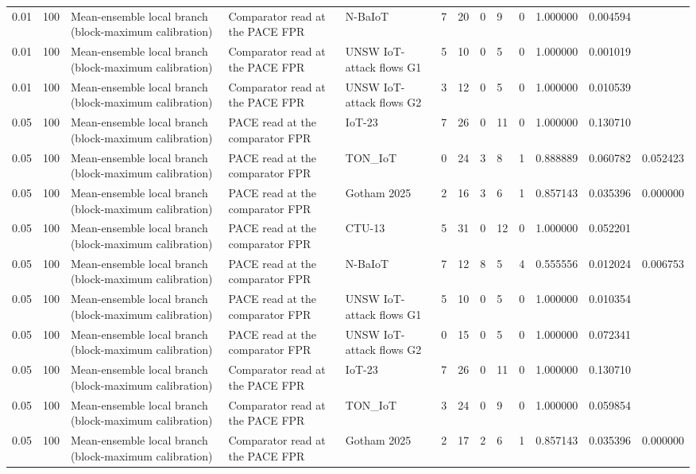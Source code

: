 \begin{tabular}{lllllllllllll}
0.01 & 100 & Mean-ensemble local branch (block-maximum calibration) & Comparator read at the PACE FPR & N-BaIoT & 7 & 20 & 0 & 9 & 0 & 1.000000 & 0.004594 &  \\
0.01 & 100 & Mean-ensemble local branch (block-maximum calibration) & Comparator read at the PACE FPR & UNSW IoT-attack flows G1 & 5 & 10 & 0 & 5 & 0 & 1.000000 & 0.001019 &  \\
0.01 & 100 & Mean-ensemble local branch (block-maximum calibration) & Comparator read at the PACE FPR & UNSW IoT-attack flows G2 & 3 & 12 & 0 & 5 & 0 & 1.000000 & 0.010539 &  \\
0.05 & 100 & Mean-ensemble local branch (block-maximum calibration) & PACE read at the comparator FPR & IoT-23 & 7 & 26 & 0 & 11 & 0 & 1.000000 & 0.130710 &  \\
0.05 & 100 & Mean-ensemble local branch (block-maximum calibration) & PACE read at the comparator FPR & TON\_IoT & 0 & 24 & 3 & 8 & 1 & 0.888889 & 0.060782 & 0.052423 \\
0.05 & 100 & Mean-ensemble local branch (block-maximum calibration) & PACE read at the comparator FPR & Gotham 2025 & 2 & 16 & 3 & 6 & 1 & 0.857143 & 0.035396 & 0.000000 \\
0.05 & 100 & Mean-ensemble local branch (block-maximum calibration) & PACE read at the comparator FPR & CTU-13 & 5 & 31 & 0 & 12 & 0 & 1.000000 & 0.052201 &  \\
0.05 & 100 & Mean-ensemble local branch (block-maximum calibration) & PACE read at the comparator FPR & N-BaIoT & 7 & 12 & 8 & 5 & 4 & 0.555556 & 0.012024 & 0.006753 \\
0.05 & 100 & Mean-ensemble local branch (block-maximum calibration) & PACE read at the comparator FPR & UNSW IoT-attack flows G1 & 5 & 10 & 0 & 5 & 0 & 1.000000 & 0.010354 &  \\
0.05 & 100 & Mean-ensemble local branch (block-maximum calibration) & PACE read at the comparator FPR & UNSW IoT-attack flows G2 & 0 & 15 & 0 & 5 & 0 & 1.000000 & 0.072341 &  \\
0.05 & 100 & Mean-ensemble local branch (block-maximum calibration) & Comparator read at the PACE FPR & IoT-23 & 7 & 26 & 0 & 11 & 0 & 1.000000 & 0.130710 &  \\
0.05 & 100 & Mean-ensemble local branch (block-maximum calibration) & Comparator read at the PACE FPR & TON\_IoT & 3 & 24 & 0 & 9 & 0 & 1.000000 & 0.059854 &  \\
0.05 & 100 & Mean-ensemble local branch (block-maximum calibration) & Comparator read at the PACE FPR & Gotham 2025 & 2 & 17 & 2 & 6 & 1 & 0.857143 & 0.035396 & 0.000000 \\

\end{tabular}
